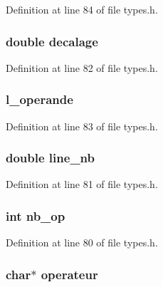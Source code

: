 Definition at line 84 of file types.\-h.

\hypertarget{struct__text___aac945295366b3dadfd1ec0da01eb6cb8}{
\subsubsection[{decalage}]{\setlength{\rightskip}{0pt plus 5cm}double decalage}}\label{struct__text___aac945295366b3dadfd1ec0da01eb6cb8}


Definition at line 82 of file types.\-h.

\hypertarget{struct__text___acdac487d99d10dba873a0f07707b220f}{
\subsubsection[{l\-\_\-operande}]{ l\-\_\-operande}}\label{struct__text___acdac487d99d10dba873a0f07707b220f}


Definition at line 83 of file types.\-h.

\hypertarget{struct__text___a808a37180ef5a21555b2f0f68cf73cb6}{
\subsubsection[{line\-\_\-nb}]{\setlength{\rightskip}{0pt plus 5cm}double line\-\_\-nb}}\label{struct__text___a808a37180ef5a21555b2f0f68cf73cb6}


Definition at line 81 of file types.\-h.

\hypertarget{struct__text___a88a29c0db6a919d126d1c94d573dd711}{
\subsubsection[{nb\-\_\-op}]{\setlength{\rightskip}{0pt plus 5cm}int nb\-\_\-op}}\label{struct__text___a88a29c0db6a919d126d1c94d573dd711}


Definition at line 80 of file types.\-h.

\hypertarget{struct__text___adc2a267b945f31e8e0dad4b528128cab}{
\subsubsection[{operateur}]{\setlength{\rightskip}{0pt plus 5cm}char$\ast$ operateur}}\label{struct__text___adc2a267b945f31e8e0dad4b528128cab}


